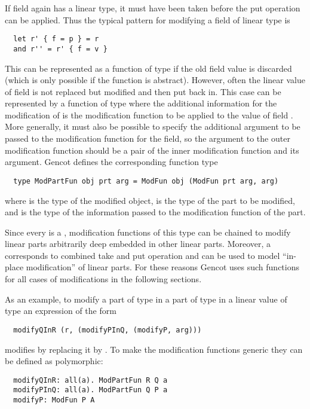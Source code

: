 If field  again has a linear type, it must have been taken before the put operation can be applied. Thus the 
typical pattern for modifying a field of linear type is
\begin{verbatim}
  let r' { f = p } = r 
  and r'' = r' { f = v }
\end{verbatim}
This can be represented as a function of type  if the old field value is discarded (which is only possible
if the function is abstract). However, often the linear value of field  is not replaced but modified and then put back
in. This case can be represented by a function of type  where the additional information for the modification
of  is the modification function to be applied to the value of field . More generally, it must also be possible
to specify the additional argument to be passed to the modification function for the field, so the argument to the outer 
modification function should be a pair of the inner modification function and its argument. Gencot defines the corresponding
function type
\begin{verbatim}
  type ModPartFun obj prt arg = ModFun obj (ModFun prt arg, arg)
\end{verbatim}
where  is the type of the modified object,  is the type of the part to be modified, and  is the type
of the information passed to the modification function of the part.

Since every  is a , modification functions of this type can be chained to modify linear parts arbitrarily 
deep embedded in other linear parts. Moreover, a  corresponds to combined take and put operation and can be used
to model ``in-place modification'' of linear parts. For these reasons Gencot uses such functions for all cases of modifications 
in the following sections.

As an example, to modify a part  of type  in a part  of type  in a linear value  of type 
an expression of the form
\begin{verbatim}
  modifyQInR (r, (modifyPInQ, (modifyP, arg)))
\end{verbatim}
modifies  by replacing it by . To make the modification functions generic they can be defined as polymorphic:
\begin{verbatim}
  modifyQInR: all(a). ModPartFun R Q a
  modifyPInQ: all(a). ModPartFun Q P a
  modifyP: ModFun P A
\end{verbatim}


